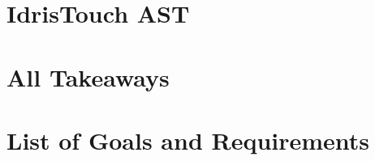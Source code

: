 \chapter{IdrisTouch AST}
\label{chap:IdrisTouch_AST}



\chapter{All Takeaways}
\label{chap:AllTakeaways}


\chapter{List of Goals and Requirements}
\label{chap:ListOfAllGoalsAndRequirements}
